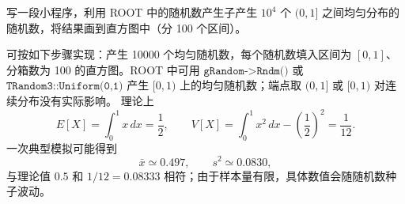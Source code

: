 ﻿


\begin{question}
写一段小程序，利用 ROOT 中的随机数产生子产生 \(10^4\) 个 \((0,1]\)
之间均匀分布的随机数，将结果画到直方图中（分 100 个区间）。
\begin{solution}
可按如下步骤实现：产生 10000 个均匀随机数，每个随机数填入区间为
\([0,1]\)、分箱数为 100 的直方图。ROOT 中可用
\(\texttt{gRandom->Rndm()}\) 或 \(\texttt{TRandom3::Uniform(0,1)}\) 产生
\([0,1)\) 上的均匀随机数；端点取 \((0,1]\) 或 \([0,1)\)
对连续分布没有实际影响。
理论上
\[
E[X]=\int_0^1 x\,dx=\frac12,
\qquad
V[X]=\int_0^1 x^2\,dx-\left(\frac12\right)^2=\frac1{12}.
\]
一次典型模拟可能得到
\[
\bar x\simeq0.497,
\qquad
s^2\simeq0.0830,
\]
与理论值 \(0.5\) 和 \(1/12=0.08333\) 相符；由于样本量有限，具体数值会随随机数种子波动。
\end{solution}
\end{question}


